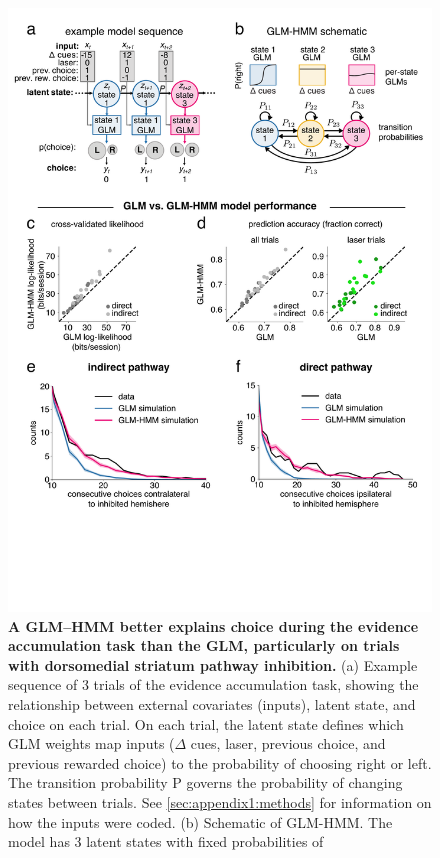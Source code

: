 \begin{figure}[t!]
  \begin{center}
    \includegraphics[width=0.90\linewidth]{ch2-glmhmm/glmhmm-figures/Fig5.pdf}
    \caption[A GLM–HMM better explains choice during the evidence accumulation task than the GLM, particularly on trials with dorsomedial striatum pathway inhibition]{\textbf{A GLM–HMM better explains choice during the evidence accumulation task than the GLM, particularly on trials with dorsomedial striatum pathway inhibition.} (a) Example sequence of 3 trials of the evidence accumulation task, showing the relationship between external covariates (inputs), latent state, and choice on each trial. On each trial, the latent state defines which GLM weights map inputs ($\Delta$ cues, laser, previous choice, and previous rewarded choice) to the probability of choosing right or left. The transition probability P governs the probability of changing states between trials. See \ref{sec:appendix1:methods} for information on how the inputs were coded. (b) Schematic of GLM-HMM. The model has 3 latent states with fixed probabilities of}
    \label{fig:glmhmm:5}
  \end{center}
  \vspace{-1.5cm}
\end{figure}
